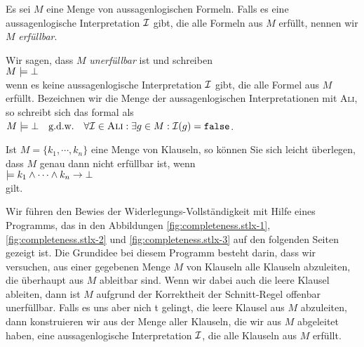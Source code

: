\begin{Definition}
  Es sei $M$ eine Menge von aussagenlogischen Formeln.
  Falls es eine aussagenlogische Interpretation $\mathcal{I}$ gibt, die alle Formeln aus $M$ erf\"{u}llt, nennen
  wir $M$ \emph{erf\"{u}llbar}. 

  Wir sagen, dass $M$ \emph{unerf\"{u}llbar} ist und schreiben 
  \\[0.2cm]
  \hspace*{1.3cm}
  $M \models \bot$
  \\[0.2cm]
  wenn es keine aussagenlogische Interpretation $\mathcal{I}$ gibt, die alle Formel aus $M$ erf\"{u}llt.
  Bezeichnen wir die Menge der aussagenlogischen Interpretationen mit
  \textsc{Ali}, so schreibt sich das formal als
  \\[0.2cm]
  \hspace*{1.3cm}
  $M \models \bot \quad \mbox{g.d.w.} \quad \forall \mathcal{I} \in \textsc{Ali}: \exists g \in M: \mathcal{I}(g) = \mathtt{false}$.   
  \eox
\end{Definition}

\remark 
Ist $M = \{ k_1, \cdots, k_n \}$ eine Menge von Klauseln, so k\"{o}nnen Sie sich leicht \"{u}berlegen, dass
$M$ genau dann nicht erf\"{u}llbar ist, wenn
\\[0.2cm]
\hspace*{1.3cm}
$\models k_1 \wedge \cdots \wedge k_n \rightarrow \bot$
\\[0.2cm]
gilt. \eox

Wir f\"{u}hren den Bewies der Widerlegungs-Vollst\"{a}ndigkeit mit Hilfe eines Programms, das in den
Abbildungen \ref{fig:completeness.stlx-1}, \ref{fig:completeness.stlx-2} und
\ref{fig:completeness.stlx-3} auf den folgenden Seiten gezeigt ist.  Die Grundidee
bei diesem Programm besteht darin, dass wir versuchen, aus einer gegebenen Menge $M$ von Klauseln
alle Klauseln abzuleiten, die \"{u}berhaupt aus $M$ ableitbar sind.  Wenn wir dabei auch
die leere Klausel ableiten, dann ist $M$ aufgrund der Korrektheit der Schnitt-Regel offenbar
unerf\"{u}llbar.  Falls es uns aber nich  t gelingt, die leere Klausel aus $M$ abzuleiten, dann konstruieren wir
aus der Menge aller Klauseln, die wir aus $M$ abgeleitet haben, eine aussagenlogische Interpretation
$\mathcal{I}$, die alle Klauseln aus $M$ erf\"{u}llt.

